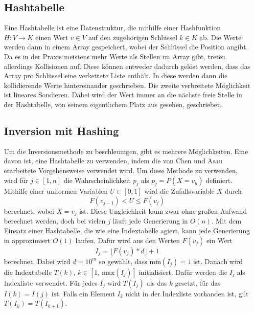 \subsection{Hashtabelle}
Eine Hashtabelle ist eine Datenstruktur, die mithilfe einer Hashfunktion $H: V \rightarrow K$ einen Wert $v \in V$ 
auf den zugehörigen Schlüssel $k \in K$ ab. Die Werte werden dann in einem Array gespeichert, 
wobei der Schlüssel die Position angibt. Da es in der Praxis meistens mehr Werte als Stellen im Array gibt, treten 
allerdings Kollisionen auf. Diese können entweder dadurch gelöst werden, dass das Array pro Schlüssel eine verkettete 
Liste enthält. In diese werden dann die kollidierende Werte hintereinander geschrieben. Die zweite verbreitete Möglichkeit 
ist lineares Sondieren. Dabei wird der Wert immer an die nächste freie Stelle in der Hashtabelle, von seinem eigentlichem 
Platz aus gesehen, geschrieben.


\subsection{Inversion mit Hashing}
Um die Inversionsmethode zu beschleunigen, gibt es mehrere Möglichkeiten. Eine davon ist, 
eine Hashtabelle zu verwenden, indem die von Chen und Asau \cite{chen_asau-generating_random_variates-1974} erarbeitete 
Vorgehensweise verwendet wird. Um diese Methode zu verwenden, wird für $j \in [1, n]$ die Wahrscheinlichkeit $p_j$ als 
$p_j = P(X=v_y)$ definiert. Mithilfe einer uniformen Variablen $U \in [0, 1]$ wird die Zufallsvariable $X$ durch 
\begin{equation}
    F(v_{j-1}) < U \leq F(v_j)
    \label{eq:hash_ineq}
\end{equation}
berechnet, wobei $X = v_j$ ist. Diese Ungleichheit kann zwar ohne großen Aufwand berechnet werden, doch bei vielen $j$ 
läuft jede Generierung in $O(n)$. Mit dem Einsatz einer Hashtabelle, die wie eine Indextabelle agiert, kann jede 
Generierung in approximiert $O(1)$ laufen. Dafür wird aus den Werten $F(v_j)$ ein Wert
\begin{equation}
     I_j = \lfloor F(v_j) * d \rfloor + 1
     \label{eq:hash_I}
\end{equation}
berechnet. Dabei wird $d = 10^m$ so gewählt, dass $\mathrm{min}(I_j) = 1$ ist. Danach wird die Indextabelle $T(k),\, k \in [1,\, 
\mathrm{max}(I_j)]$ initialisiert. Dafür werden die $I_j$ als Indexliste verwendet. Für jedes $I_j$ wird $T(I_j)$ als das 
$k$ gesetzt, für das $I(k) = I(j)$ ist. Falls ein Element $I_k$ nicht in der Indexliste vorhanden ist, gilt $T(I_k) = T(I_{k+1})$. 

